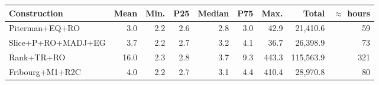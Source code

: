 \begin{tabular}{lrrrrrrrr}
  \hline
Construction & Mean & Min. & P25 & Median & P75 & Max. & Total & $\approx$ hours \\ 
  \hline
Piterman+EQ+RO & 3.0 & 2.2 & 2.6 & 2.8 & 3.0 & 42.9 & 21,410.6 & 59 \\ 
  Slice+P+RO+MADJ+EG & 3.7 & 2.2 & 2.7 & 3.2 & 4.1 & 36.7 & 26,398.9 & 73 \\ 
  Rank+TR+RO & 16.0 & 2.3 & 2.8 & 3.7 & 9.3 & 443.3 & 115,563.9 & 321 \\ 
  Fribourg+M1+R2C & 4.0 & 2.2 & 2.7 & 3.1 & 4.4 & 410.4 & 28,970.8 & 80 \\ 
   \hline
\end{tabular}
